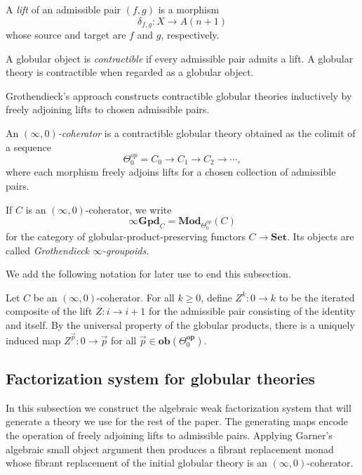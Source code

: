 \documentclass{tac}
\begin{document}
\begin{definition}
A \emph{lift} of an admissible pair
$(f,g)$
is a morphism
\[
\delta_{f,g}:X\to A(n+1)
\]
whose source and target are $f$ and $g$, respectively.
\end{definition}

\begin{definition}
A globular object is \emph{contractible} if every admissible pair admits a lift.
A globular theory is contractible when regarded as a globular object.
\end{definition}

Grothendieck's approach constructs contractible globular theories inductively by freely adjoining lifts to chosen admissible pairs.

\begin{definition}
An $(\infty,0)$\emph{-coherator} is a contractible globular theory obtained as the colimit of a sequence
\[
\Theta_0^{op}=C_0
\longrightarrow
C_1
\longrightarrow
C_2
\longrightarrow\cdots,
\]
where each morphism freely adjoins lifts for a chosen collection of admissible pairs.
\end{definition}

\begin{notation}
If $C$ is an $(\infty,0)$-coherator, we write
\[
\infty\mathbf{Gpd}_C
=
\mathbf{Mod}_{\Theta_0^{op}}(C)
\]
for the category of globular-product-preserving functors
$C\to\mathbf{Set}$.
Its objects are called \emph{Grothendieck $\infty$-groupoids}.
\end{notation}

We add the following notation for later use to end this subsection.

\begin{notation}\label{notation_for_induced_ids}
Let $C$ be an $(\infty,0)$-coherator. For all $k\geq 0$, define $Z^k:0\to k$ to be the iterated composite of the lift $Z:i\to i+1$ for the admissible pair consisting of the identity and itself. By the universal property of the globular products, there is a uniquely induced map $Z^{\vec{p}}:0\to\vec{p}$ for all $\vec{p}\in\textbf{ob}(\Theta_0^\mathbf{op})$. 
\end{notation}

\subsection*{Factorization system for globular theories}

In this subsection we construct the algebraic weak factorization system that will generate a theory we use for the rest of the paper. The generating maps encode the operation of freely adjoining lifts to admissible pairs. Applying Garner's algebraic small object argument then produces a fibrant replacement monad whose fibrant replacement of the initial globular theory is an $(\infty,0)$-coherator. 
\end{document}
